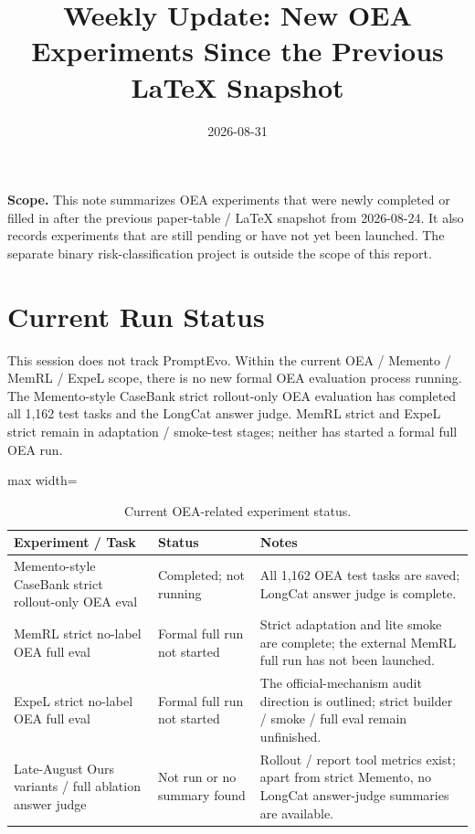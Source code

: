 \documentclass[11pt]{article}
\title{Weekly Update: New OEA Experiments Since the Previous LaTeX Snapshot}
\author{}
\date{2026-08-31}
\begin{document}
\maketitle

\noindent\textbf{Scope.} This note summarizes OEA experiments that were newly completed or filled in after the previous paper-table / LaTeX snapshot from 2026-08-24. It also records experiments that are still pending or have not yet been launched. The separate binary risk-classification project is outside the scope of this report.

\section{Current Run Status}

This session does not track PromptEvo. Within the current OEA / Memento / MemRL / ExpeL scope, there is no new formal OEA evaluation process running. The Memento-style CaseBank strict rollout-only OEA evaluation has completed all 1,162 test tasks and the LongCat answer judge. MemRL strict and ExpeL strict remain in adaptation / smoke-test stages; neither has started a formal full OEA run.

\begin{table}[h]
\centering
\caption{Current OEA-related experiment status.}
\scriptsize
\begin{adjustbox}{max width=\textwidth}
\begin{tabular}{lll}
\toprule
\textbf{Experiment / Task} & \textbf{Status} & \textbf{Notes} \\
\midrule
Memento-style CaseBank strict rollout-only OEA eval & Completed; not running & All 1,162 OEA test tasks are saved; LongCat answer judge is complete. \\
MemRL strict no-label OEA full eval & Formal full run not started & Strict adaptation and lite smoke are complete; the external MemRL full run has not been launched. \\
ExpeL strict no-label OEA full eval & Formal full run not started & The official-mechanism audit direction is outlined; strict builder / smoke / full eval remain unfinished. \\
Late-August Ours variants / full ablation answer judge & Not run or no summary found & Rollout / report tool metrics exist; apart from strict Memento, no LongCat answer-judge summaries are available. \\
\bottomrule
\end{tabular}
\end{adjustbox}
\end{table}
\end{document}
